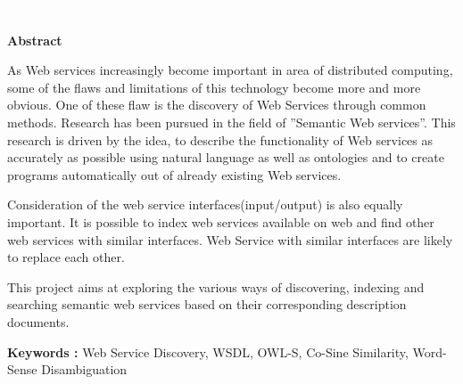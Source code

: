 \documentclass[12pt, oneside]{book}
\begin{document}
\pagebreak \textcolor{white}{text} \pagebreak
\thispagestyle{empty}
\begin{center}
	\textbf{ \huge Abstract}
\end{center}
\vspace{1cm}
As Web services increasingly become important in area of distributed computing, some of the flaws and limitations of this technology become more and more obvious. One of these flaw is the discovery of Web Services through common methods. Research has been pursued in the field of ”Semantic Web services”. This research is driven by the idea, to describe the functionality of Web services as accurately as possible using natural language as well as ontologies and to create programs automatically out of already existing Web services. \\ \par
Consideration of the web service interfaces(input/output) is also equally important. It is possible to index web services available on web and find other web services with similar interfaces. Web Service with similar interfaces are likely to replace each other. \\ \par
This project aims at exploring the various ways of discovering, indexing and searching semantic web services based on their corresponding description documents. \\ \par
\textbf{Keywords : }Web Service Discovery, WSDL, OWL-S, Co-Sine Similarity, Word-Sense Disambiguation
\pagebreak
\thispagestyle{empty}
\pagebreak
\listoffigures
\listoftables
\tableofcontents

\pagebreak

\setcounter{page}{1}
\end{document}
